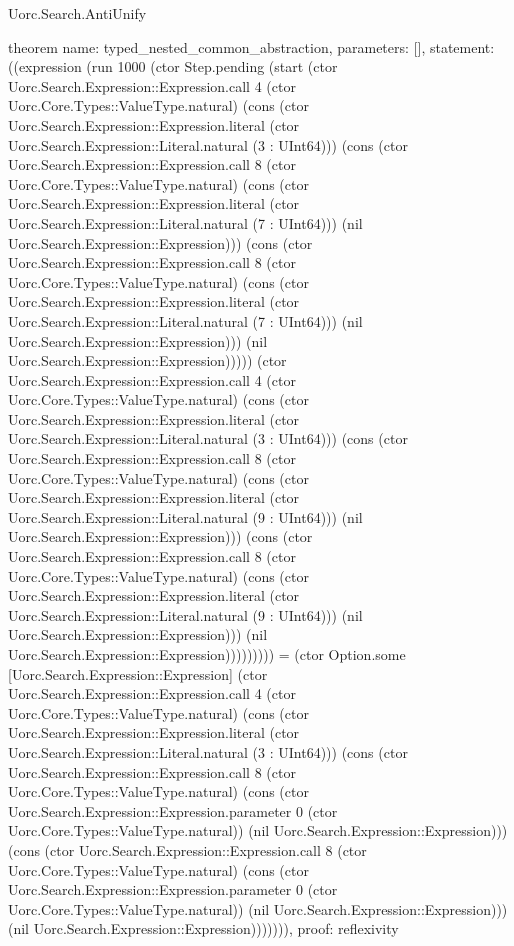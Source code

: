 \begin{lexlean}{Uorc.Search.AntiUnify}
\begin{semanticmodule}
theorem{
  name: typed_nested_common_abstraction,
  parameters: [],
  statement: ((expression (run 1000 (ctor Step.pending (start (ctor Uorc.Search.Expression::Expression.call 4 (ctor Uorc.Core.Types::ValueType.natural) (cons (ctor Uorc.Search.Expression::Expression.literal (ctor Uorc.Search.Expression::Literal.natural (3 : UInt64))) (cons (ctor Uorc.Search.Expression::Expression.call 8 (ctor Uorc.Core.Types::ValueType.natural) (cons (ctor Uorc.Search.Expression::Expression.literal (ctor Uorc.Search.Expression::Literal.natural (7 : UInt64))) (nil Uorc.Search.Expression::Expression))) (cons (ctor Uorc.Search.Expression::Expression.call 8 (ctor Uorc.Core.Types::ValueType.natural) (cons (ctor Uorc.Search.Expression::Expression.literal (ctor Uorc.Search.Expression::Literal.natural (7 : UInt64))) (nil Uorc.Search.Expression::Expression))) (nil Uorc.Search.Expression::Expression))))) (ctor Uorc.Search.Expression::Expression.call 4 (ctor Uorc.Core.Types::ValueType.natural) (cons (ctor Uorc.Search.Expression::Expression.literal (ctor Uorc.Search.Expression::Literal.natural (3 : UInt64))) (cons (ctor Uorc.Search.Expression::Expression.call 8 (ctor Uorc.Core.Types::ValueType.natural) (cons (ctor Uorc.Search.Expression::Expression.literal (ctor Uorc.Search.Expression::Literal.natural (9 : UInt64))) (nil Uorc.Search.Expression::Expression))) (cons (ctor Uorc.Search.Expression::Expression.call 8 (ctor Uorc.Core.Types::ValueType.natural) (cons (ctor Uorc.Search.Expression::Expression.literal (ctor Uorc.Search.Expression::Literal.natural (9 : UInt64))) (nil Uorc.Search.Expression::Expression))) (nil Uorc.Search.Expression::Expression))))))))) = (ctor Option.some [Uorc.Search.Expression::Expression] (ctor Uorc.Search.Expression::Expression.call 4 (ctor Uorc.Core.Types::ValueType.natural) (cons (ctor Uorc.Search.Expression::Expression.literal (ctor Uorc.Search.Expression::Literal.natural (3 : UInt64))) (cons (ctor Uorc.Search.Expression::Expression.call 8 (ctor Uorc.Core.Types::ValueType.natural) (cons (ctor Uorc.Search.Expression::Expression.parameter 0 (ctor Uorc.Core.Types::ValueType.natural)) (nil Uorc.Search.Expression::Expression))) (cons (ctor Uorc.Search.Expression::Expression.call 8 (ctor Uorc.Core.Types::ValueType.natural) (cons (ctor Uorc.Search.Expression::Expression.parameter 0 (ctor Uorc.Core.Types::ValueType.natural)) (nil Uorc.Search.Expression::Expression))) (nil Uorc.Search.Expression::Expression))))))),
  proof: reflexivity{}
}


\end{semanticmodule}
\end{lexlean}
